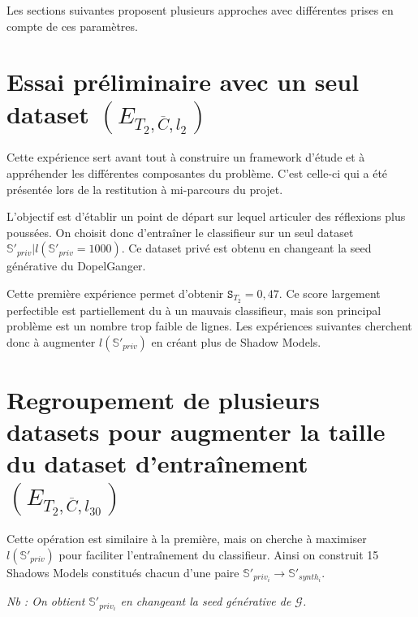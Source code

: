         Les sections suivantes proposent plusieurs approches avec différentes prises en compte de
        ces paramètres.
    \section{Essai préliminaire avec un seul dataset $\left(E_{T_2, \overline C, l_{2}}\right)$}

        Cette expérience sert avant tout à construire un framework d'étude et à appréhender les
        différentes composantes du problème. C'est celle-ci qui a été présentée lors de la
        restitution à mi-parcours du projet.

        L'objectif est d'établir un point de départ sur lequel articuler des réflexions plus
        poussées. On choisit donc d'entraîner le classifieur sur un seul dataset
        $\mathbb S'_{priv} | l\left( \mathbb{S}'_{priv} = 1000 \right)$. Ce dataset privé est
        obtenu en changeant la seed générative du DopelGanger.

        \begin{tcolorbox}[colback=linkborder_Color!5!white,colframe=linkborder_Color!75!black]
            Cette première expérience permet d'obtenir $\mathtt S_{T_2}=0,47$. Ce score
            largement perfectible est partiellement du à un mauvais classifieur, mais son
            principal problème est un nombre trop faible de lignes. Les expériences suivantes
            cherchent donc à augmenter $l\left( \mathbb S'_{priv} \right)$ en créant plus de
            Shadow Models.
        \end{tcolorbox}
    \newpage\section{Regroupement de plusieurs datasets pour augmenter la taille du dataset
d'entraînement $\left(E_{T_2, \overline C, l_{30}}\right)$}
        Cette opération est similaire à la première, mais on cherche à maximiser $l\left( \mathbb S'_{priv} \right)$
        pour faciliter l'entraînement du classifieur. Ainsi on construit 15 Shadows Models
        constitués chacun d'une paire $\mathbb{S}'_{priv_i}\longrightarrow \mathbb{S}'_{synth_i}$.

        \textit{Nb : On obtient $\mathbb{S}'_{priv_i}$ en changeant la seed générative de $\mathcal G$.}

